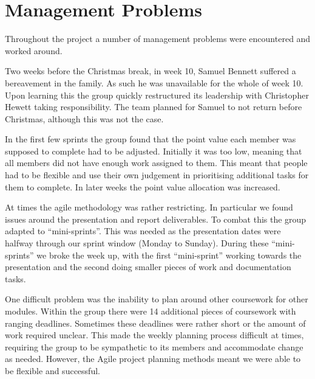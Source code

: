 \section{Management Problems}

Throughout the project a number of management problems were encountered and worked around.

Two weeks before the Christmas break, in week 10, Samuel Bennett suffered a bereavement in the family. As such he was unavailable for the whole of week 10. Upon learning this the group quickly restructured its leadership with Christopher Hewett taking responsibility. The team planned for Samuel to not return before Christmas, although this was not the case.

In the first few sprints the group found that the point value each member was supposed to complete had to be adjusted. Initially it was too low, meaning that all members did not have enough work assigned to them. This meant that people had to be flexible and use their own judgement in prioritising additional tasks for them to complete. In later weeks the point value allocation was increased.

At times the agile methodology was rather restricting. In particular we found issues around the presentation and report deliverables. To combat this the group adapted to ``mini-sprints''. This was needed as the presentation dates were halfway through our sprint window (Monday to Sunday). During these ``mini-sprints'' we broke the week up, with the first ``mini-sprint'' working towards the presentation and the second doing smaller pieces of work and documentation tasks.

One difficult problem was the inability to plan around other coursework for other modules. Within the group there were 14 additional pieces of coursework with ranging deadlines. Sometimes these deadlines were rather short or the amount of work required unclear. This made the weekly planning process difficult at times, requiring the group to be sympathetic to its members and accommodate change as needed. However, the Agile project planning methods meant we were able to be flexible and successful.
